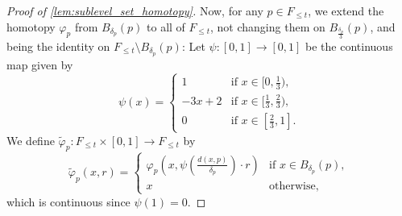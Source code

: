 \begin{proof}[Proof of \cref{lem:sublevel_set_homotopy}]
	Now, for any $p \in F_{\leq t}$, we extend the homotopy $\varphi_{p}$ from $B_{\delta_{p}}(p)$ to all of $F_{\leq t}$, not changing them on $B_{\frac{\delta_{p}}{3}}(p)$, and being the identity on $F_{\leq t} \setminus B_{\delta_{p}}(p)$:
	Let $\psi \colon [0,1] \to [0,1]$ be the continuous map given by
	\[
		\psi(x) =
		\begin{cases}
			1 & \text{if } x \in [0,\frac{1}{3}), \\
			-3x + 2 & \text{if } x \in [\frac{1}{3}, \frac{2}{3}), \\
			0 & \text{if } x \in [\frac{2}{3},1].
		\end{cases}
	\]
	We define $\tilde{\varphi}_{p} \colon F_{\leq t} \times [0,1] \to F_{\leq t}$ by
	\[
		\tilde{\varphi}_{p}(x,r) =
		\begin{cases}
			\varphi_{p} \left( x, \psi \left( \frac{d(x,p)}{\delta_{p}} \right) \cdot r \right)  & \text{if } x \in B_{\delta_{p}}(p), \\
			x & \text{otherwise},
		\end{cases}
	\]
	which is continuous since $\psi(1) = 0$.
	

\end{proof}
